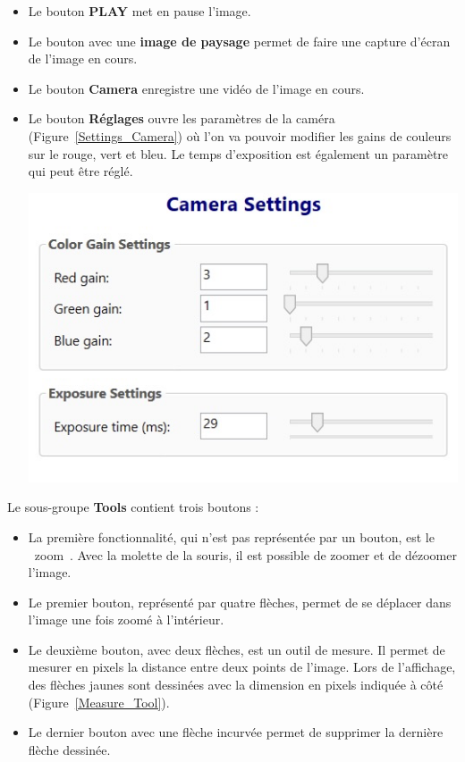 \begin{itemize}[label=\textbullet]
    \item Le bouton \textbf{PLAY} met en pause l'image.
    \item Le bouton avec une \textbf{image de paysage} permet de faire une capture d'écran de l'image en cours.
    \item Le bouton \textbf{Camera} enregistre une vidéo de l'image en cours.
    \item
          \begin{minipage}{0.4\textwidth}
              Le bouton \textbf{Réglages} ouvre les paramètres de la caméra (Figure~\ref{Settings_Camera}) où l'on va pouvoir modifier les gains de couleurs sur le rouge, vert et bleu. Le temps d'exposition est également un paramètre qui peut être réglé.
          \end{minipage}
          \hfill
          \begin{minipage}{0.55\textwidth}
              \centering
              \includegraphics[width=\textwidth]{assets/figures/Application_ServoVision/Settings_Camera.png}
              \label{Settings_Camera}
          \end{minipage}
\end{itemize}
Le sous-groupe \textbf{Tools} contient trois boutons :
\begin{itemize}[label=\textbullet]
    \item La première fonctionnalité, qui n'est pas représentée par un bouton, est le \guillemotleft~zoom~\guillemotright. Avec la molette de la souris, il est possible de zoomer et de dézoomer l'image.
    \item Le premier bouton, représenté par quatre flèches, permet de se déplacer dans l'image une fois zoomé à l'intérieur.
    \item Le deuxième bouton, avec deux flèches, est un outil de mesure. Il permet de mesurer en pixels la distance entre deux points de l'image. Lors de l'affichage, des flèches jaunes sont dessinées avec la dimension en pixels indiquée à côté (Figure~\ref{Measure_Tool}).
    \item Le dernier bouton avec une flèche incurvée permet de supprimer la dernière flèche dessinée.
\end{itemize}

